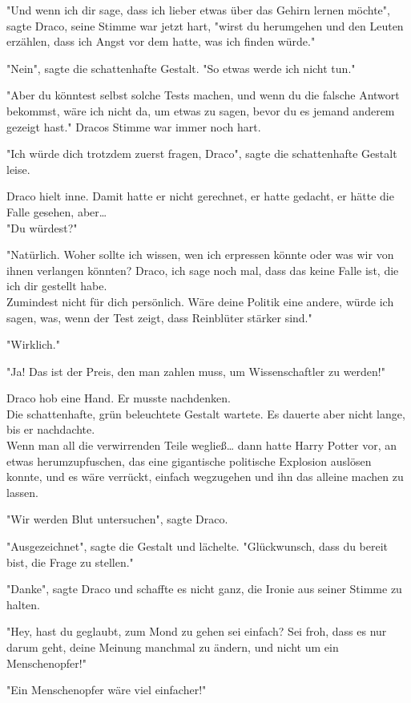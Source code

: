 {"Und wenn ich dir sage, dass ich lieber etwas über das Gehirn lernen möchte", sagte Draco, seine Stimme war jetzt hart, "wirst du herumgehen und den Leuten erzählen, dass ich Angst vor dem hatte, was ich finden würde."

"Nein", sagte die schattenhafte Gestalt. "So etwas werde ich nicht tun."

"Aber du könntest selbst solche Tests machen, und wenn du die falsche Antwort bekommst, wäre ich nicht da, um etwas zu sagen, bevor du es jemand anderem gezeigt hast." Dracos Stimme war immer noch hart.

"Ich würde dich trotzdem zuerst fragen, Draco", sagte die schattenhafte Gestalt leise.

Draco hielt inne. Damit hatte er nicht gerechnet, er hatte gedacht, er hätte die Falle gesehen, aber…\\ "Du würdest?"

"Natürlich. Woher sollte ich wissen, wen ich erpressen könnte oder was wir von ihnen verlangen könnten? Draco, ich sage noch mal, dass das keine Falle ist, die ich dir gestellt habe.\\ Zumindest nicht für dich persönlich. Wäre deine Politik eine andere, würde ich sagen, was, wenn der Test zeigt, dass Reinblüter stärker sind."

"Wirklich."

"Ja! Das ist der Preis, den man zahlen muss, um Wissenschaftler zu werden!"

Draco hob eine Hand. Er musste nachdenken.\\ Die schattenhafte, grün beleuchtete Gestalt wartete. Es dauerte aber nicht lange, bis er nachdachte.\\ Wenn man all die verwirrenden Teile wegließ… dann hatte Harry Potter vor, an etwas herumzupfuschen, das eine gigantische politische Explosion auslösen konnte, und es wäre verrückt, einfach wegzugehen und ihn das alleine machen zu lassen.

"Wir werden Blut untersuchen", sagte Draco.

"Ausgezeichnet", sagte die Gestalt und lächelte. "Glückwunsch, dass du bereit bist, die Frage zu stellen."

"Danke", sagte Draco und schaffte es nicht ganz, die Ironie aus seiner Stimme zu halten.

"Hey, hast du geglaubt, zum Mond zu gehen sei einfach? Sei froh, dass es nur darum geht, deine Meinung manchmal zu ändern, und nicht um ein Menschenopfer!"

"Ein Menschenopfer wäre viel einfacher!"

}
